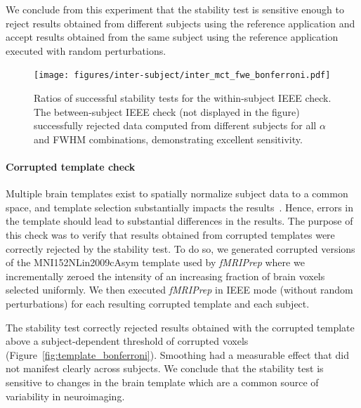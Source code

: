 \documentclass[lettersize,journal]{IEEEtran}
\newcommand{\TG}[1]{\color{orange}\textsc{TG:} #1\color{black}\xspace}
\newcommand{\fmriprep}{\emph{fMRIPrep}\xspace}
\begin{document}
We conclude from this experiment that the stability test is sensitive enough to reject results obtained from different subjects using the reference application and accept results obtained from the same subject using the reference application executed with random perturbations.

\begin{figure}
    \centering
    \texttt{[image: figures/inter-subject/inter\_mct\_fwe\_bonferroni.pdf]}
    \caption{Ratios of successful stability tests for the within-subject IEEE check. The between-subject IEEE check (not displayed in the figure) successfully rejected data computed from different subjects for all $\alpha$ and FWHM combinations, demonstrating excellent sensitivity.
    }
    \label{fig:ieee-check}
\end{figure}

\paragraph{Corrupted template check}

Multiple brain templates exist to spatially normalize subject data to a common space, and template selection substantially impacts the results~\cite{li2021moving}. Hence, errors in the template should lead to substantial differences in the results. The purpose of this check was to verify that results obtained from corrupted templates were correctly rejected by the stability test.
To do so, we generated corrupted versions of the MNI152NLin2009cAsym template used by \fmriprep where we incrementally zeroed the intensity of an increasing fraction of brain voxels selected uniformly. We then executed \fmriprep in IEEE mode (without random perturbations) for each resulting corrupted template and each subject.

The stability test correctly rejected results obtained with the corrupted template above a subject-dependent threshold of corrupted voxels (Figure~\ref{fig:template_bonferroni}). Smoothing had a measurable effect that did not manifest clearly across subjects. We conclude that the stability test is sensitive to changes in the brain template which are a common source of variability in neuroimaging.

\end{document}
